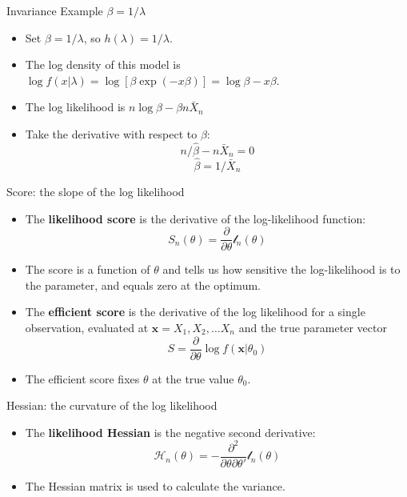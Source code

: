 \documentclass[aspectratio=169, handout, t]{beamer}
\numberwithin{equation}{section}
\begin{document}
\begin{frame}{Invariance Example $\beta=1/\lambda$}
\begin{itemize}
\item Set $\beta=1/\lambda$, so $h(\lambda)=1/\lambda$.\pause
\item The log density of this model is $\log f(x|\lambda)=\log [\beta\exp(-x\beta)]=\log \beta-x\beta$.\pause
\item The log likelihood is $n\log\beta-\beta n \bar{X}_n$\pause
\item Take the derivative with respect to $\beta$:\pause
$$n/\hat{\beta}-n\bar{X}_n=0$$\pause
$$\hat{\beta}=1/\bar{X}_n$$
\end{itemize}
\end{frame}


\begin{frame}{Score: the slope of the log likelihood}

\begin{itemize}

\item The \textbf{likelihood score} is the derivative of the log-likelihood function:
$$S_n(\theta)=\frac{\partial}{\partial \theta} \mathcal{l}_n(\theta)$$\pause
\item The score is a function of $\theta$ and tells us how sensitive the log-likelihood is to the parameter, and equals zero at the optimum.\pause
\item The \textbf{efficient score} is the derivative of the log likelihood for a single observation, evaluated at $\bm{x}=X_1, X_2,\ldots X_n$ and the true parameter vector
$$S=\frac{\partial}{\partial \theta}\log f(\bm{x}|\theta_0)$$\pause
\item The efficient score fixes $\theta$ at the true value $\theta_0$.
\end{itemize}
\end{frame}



\begin{frame}{Hessian: the curvature of the log likelihood}
\begin{itemize}
\item The \textbf{likelihood Hessian} is the negative second derivative:
$$\mathcal{H}_n(\theta)=-\frac{\partial^2}{\partial \theta \partial \theta'}\mathcal{l}_n(\theta)$$
\item The Hessian matrix is used to calculate the variance.
\end{itemize}
\end{frame}
\end{document}
